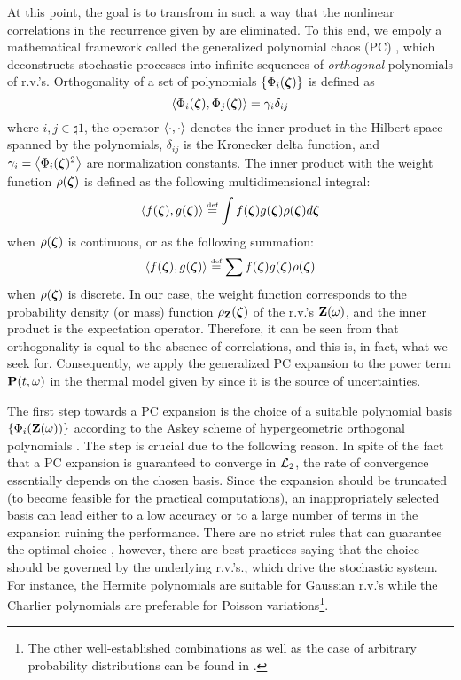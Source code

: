 At this point, the goal is to transfrom  in such a way that the nonlinear correlations in the recurrence given by  are eliminated. To this end, we empoly a mathematical framework called the generalized polynomial chaos (PC) \cite{xiu2002}, which deconstructs stochastic processes into infinite sequences of \emph{orthogonal} polynomials of r.v.'s. Orthogonality of a set of polynomials $\{ \Phi_i(\boldsymbol{\zeta}) \}$ is defined as
\begin{equation} \elabel{orthogonality}
  \oInner{\pcb_i(\vz)}{\pcb_j(\vz)} = \pcn_i \delta_{ij}
\end{equation}
where $i,j \in \natural{1}$, the operator $\oInner{\cd}{\cd}$ denotes the inner product in the Hilbert space spanned by the polynomials, $\delta_{ij}$ is the Kronecker delta function, and $\pcn_i = \oInner{\pcb_i(\vz)^2}$ are normalization constants. The inner product with the weight function $\rho(\boldsymbol{\zeta})$ is defined as the following multidimensional integral:
\begin{equation} \elabel{inner-product-integral}
  \oInner{f(\vz)}{g(\vz)} \eqdef \int f(\vz) g(\vz) \PDF(\vz) d\vz
\end{equation}
when $\rho(\boldsymbol{\zeta})$ is continuous, or as the following summation:
\begin{equation} \elabel{inner-product-sum}
  \oInner{f(\vz)}{g(\vz)} \eqdef \sum f(\vz) g(\vz) \PDF(\vz)
\end{equation}
when $\rho(\boldsymbol{\zeta})$ is discrete. In our case, the weight function corresponds to the probability density (or mass) function $\rho_{\mathbf{Z}}(\boldsymbol{\zeta})$ of the r.v.'s $\mathbf{Z}(\omega)$, and the inner product is the expectation operator. Therefore, it can be seen from  that orthogonality is equal to the absence of correlations, and this is, in fact, what we seek for. Consequently, we apply the generalized PC expansion to the power term $\mathbf{P}(t, \omega)$ in the thermal model given by  since it is the source of uncertainties.

The first step towards a PC expansion is the choice of a suitable polynomial basis $\{ \Phi_i(\mathbf{Z}(\omega)) \}$ according to the Askey scheme of hypergeometric orthogonal polynomials \cite{xiu2002}. The step is crucial due to the following reason. In spite of the fact that a PC expansion is guaranteed to converge in $\mathcal{L}_{2}$, the rate of convergence essentially depends on the chosen basis. Since the expansion should be truncated (to become feasible for the practical computations), an inappropriately selected basis can lead either to a low accuracy or to a large number of terms in the expansion ruining the performance. There are no strict rules that can guarantee the optimal choice \cite{knio2006, maitre2010}, however, there are best practices saying that the choice should be governed by the underlying r.v.'s., which drive the stochastic system. For instance, the Hermite polynomials are suitable for Gaussian r.v.'s while the Charlier polynomials are preferable for Poisson variations\footnote{The other well-established combinations as well as the case of arbitrary probability distributions can be found in \cite{xiu2002}.}.

